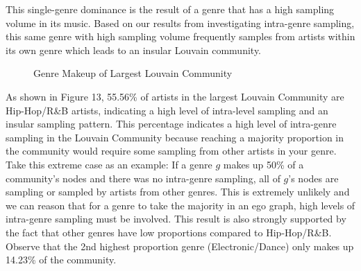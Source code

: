 \documentclass[pageno]{jpaper}
\begin{document}
This single-genre dominance is the result of a genre that has a high sampling volume in its music. Based on our results from investigating intra-genre sampling, this same genre with high sampling volume frequently samples from artists within its own genre which leads to an insular Louvain community.
\begin{figure}[H]
\caption{Genre Makeup of Largest Louvain Community}
\label{fig:fig13}
\centering
\end{figure}
As shown in Figure 13, 55.56\% of artists in the largest Louvain Community are Hip-Hop/R\&B artists, indicating a high level of intra-level sampling and an insular sampling pattern. This percentage indicates a high level of intra-genre sampling in the Louvain Community because reaching a majority proportion in the community would require some sampling from other artists in your genre. Take this extreme case as an example: If a genre $g$ makes up 50\% of a community's nodes and there was no intra-genre sampling, all of $g$'s nodes are sampling or sampled by artists from other genres. This is extremely unlikely and we can reason that for a genre to take the majority in an ego graph, high levels of intra-genre sampling must be involved. This result is also strongly supported by the fact that other genres have low proportions compared to Hip-Hop/R\&B. Observe that the 2nd highest proportion genre (Electronic/Dance) only makes up 14.23\% of the community.
\end{document}
